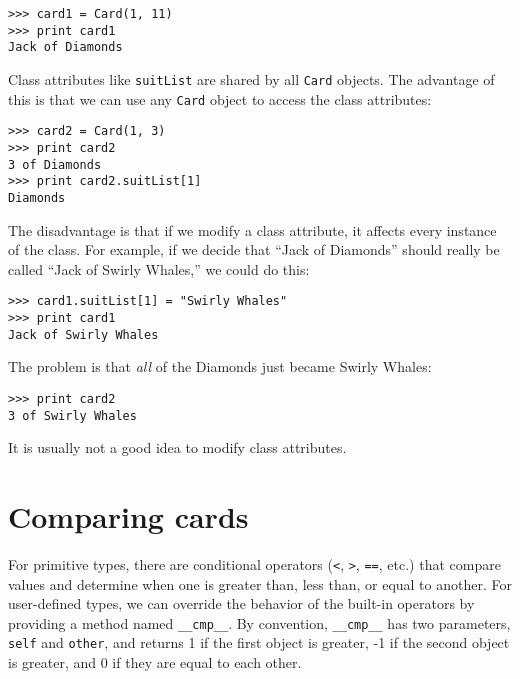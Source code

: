 \beforeverb
\begin{verbatim}
>>> card1 = Card(1, 11)
>>> print card1
Jack of Diamonds
\end{verbatim}
\afterverb
%
Class attributes like {\tt suitList} are shared by all {\tt Card}
objects.  The advantage of this is that we can use any {\tt Card}
object to access the class attributes:

\beforeverb
\begin{verbatim}
>>> card2 = Card(1, 3)
>>> print card2
3 of Diamonds
>>> print card2.suitList[1]
Diamonds
\end{verbatim}
\afterverb
%
The disadvantage is that if we modify a class attribute, it
affects every instance of the class.  For example, if we decide
that ``Jack of Diamonds'' should really be called
``Jack of Swirly Whales,'' we could do this:


\beforeverb
\begin{verbatim}
>>> card1.suitList[1] = "Swirly Whales"
>>> print card1
Jack of Swirly Whales
\end{verbatim}
\afterverb
%
The problem is that {\em all} of the Diamonds just became
Swirly Whales:

\beforeverb
\begin{verbatim}
>>> print card2
3 of Swirly Whales
\end{verbatim}
\afterverb
%
It is usually not a good idea to modify class attributes.



\section{Comparing cards}
\label{comparecard}

For primitive types, there are conditional operators
({\tt <}, {\tt >}, {\tt ==}, etc.)
that compare
values and determine when one is greater than, less than, or equal to
another.  For user-defined types, we can override the behavior of
the built-in operators by providing a method named
{\tt \_\_cmp\_\_}.  By convention, {\tt \_\_cmp\_\_}
has two parameters, {\tt self} and {\tt other}, and returns
1 if the first object is greater, -1 if the
second object is greater, and 0 if they are equal to each other.


